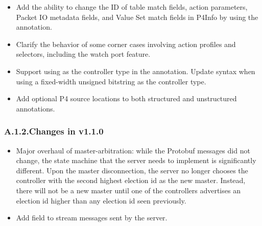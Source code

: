 \documentclass[11pt]{article}
\begin{document}
{\begin{itemize}[noitemsep,topsep=\mdcompacttopsep]
\item{}Add the ability to change the ID of table match fields, action parameters,
Packet IO metadata fields, and Value Set match fields in P4Info by using the
 annotation.%

\item{}Clarify the behavior of some corner cases involving action profiles and
selectors, including the watch port feature.%

\item{}Support using  as the controller type in the 
annotation. Update syntax when using a fixed-width unsigned bitstring as the
controller type.%

\item{}Add optional P4 source locations to both structured and unstructured
annotations.%
\end{itemize}%

\subsubsection{A.1.2.\hspace*{0.5em}Changes in v1.1.0}\label{sec-changes-in-v110}%

\begin{itemize}[noitemsep,topsep=\mdcompacttopsep]%

\item{}Major overhaul of master-arbitration: while the Protobuf messages did not
change, the state machine that the server needs to implement is significantly
different. Upon the master disconnection, the server no longer chooses the
controller with the second highest election id as the new master. Instead,
there will not be a new master until one of the controllers advertises an
election id higher than any election id seen previously.%

\item{}Add  field to stream messages sent by the server.%


\end{itemize}}
\end{document}
